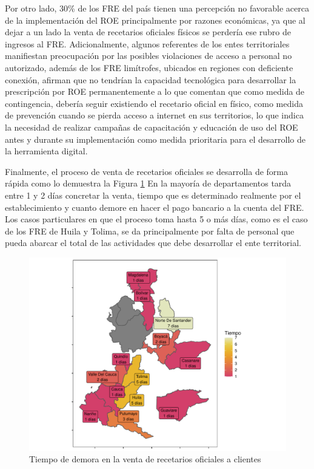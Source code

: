 \documentclass[
]{book}
\begin{document}
Por otro lado, 30\% de los FRE del país tienen una percepción no favorable acerca de la implementación del ROE principalmente por razones económicas, ya que al dejar a un lado la venta de recetarios oficiales físicos se perdería ese rubro de ingresos al FRE. Adicionalmente, algunos referentes de los entes territoriales manifiestan preocupación por las posibles violaciones de acceso a personal no autorizado, además de los FRE limítrofes, ubicados en regiones con deficiente conexión, afirman que no tendrían la capacidad tecnológica para desarrollar la prescripción por ROE permanentemente a lo que comentan que como medida de contingencia, debería seguir existiendo el recetario oficial en físico, como medida de prevención cuando se pierda acceso a internet en sus territorios, lo que indica la necesidad de realizar campañas de capacitación y educación de uso del ROE antes y durante su implementación como medida prioritaria para el desarrollo de la herramienta digital.

Finalmente, el proceso de venta de recetarios oficiales se desarrolla de forma rápida como lo demuestra la Figura \ref{fig:TiempoVentaInstituciones} En la mayoría de departamentos tarda entre 1 y 2 días concretar la venta, tiempo que es determinado realmente por el establecimiento y cuanto demore en hacer el pago bancario a la cuenta del FRE. Los casos particulares en que el proceso toma hasta 5 o más días, como es el caso de los FRE de Huila y Tolima, se da principalmente por falta de personal que pueda abarcar el total de las actividades que debe desarrollar el ente territorial.

\begin{figure}
\includegraphics[width=0.9\linewidth]{InformeFinal_files/figure-latex/TiempoVentaInstituciones-1} \caption{Tiempo de demora en la venta de recetarios oficiales a clientes}\label{fig:TiempoVentaInstituciones}
\end{figure}
\end{document}
